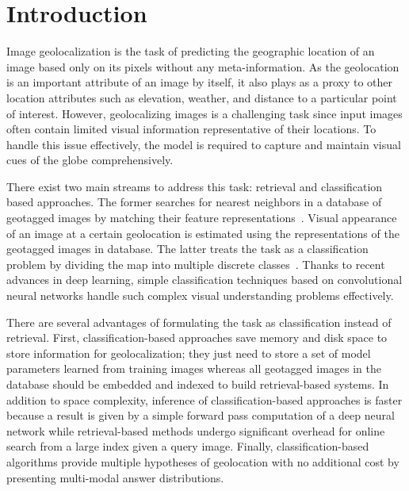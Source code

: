 \documentclass[runningheads]{llncs}
\begin{document}
\section{Introduction}
\label{sec:introduction}

Image geolocalization is the task of predicting the geographic location of an image based only on its pixels without any meta-information.
As the geolocation is an important attribute of an image by itself, it also plays as a proxy to other location attributes such as elevation, weather, and distance to a particular point of interest.
However, geolocalizing images is a challenging task since input images often contain limited visual information representative of their locations.
To handle this issue effectively, the model is required to capture and maintain visual cues of the globe comprehensively.

There exist two main streams to address this task: retrieval and classification based approaches.
The former searches for nearest neighbors in a database of geotagged images by matching their feature representations~\cite{hays08im2gps,hays15large,vo17revisiting}.
Visual appearance of an image at a certain geolocation is estimated using the representations of the geotagged images in database.
The latter treats the task as a classification problem by dividing the map into multiple discrete classes~\cite{vo17revisiting,weyand16planet}.
Thanks to recent advances in deep learning, simple classification techniques based on convolutional neural networks handle such complex visual understanding problems effectively.


There are several advantages of formulating the task as classification instead of retrieval.
First, classification-based approaches save memory and disk space to store information for geolocalization; they just need to store a set of model parameters learned from training images whereas all geotagged images in the database should be embedded and indexed to build retrieval-based systems.
In addition to space complexity, inference of classification-based approaches is faster because a result is given by a simple forward pass computation of a deep neural network while retrieval-based methods undergo significant overhead for online search from a large index given a query image.
Finally, classification-based algorithms provide multiple hypotheses of geolocation with no additional cost by presenting multi-modal answer distributions.
\end{document}
